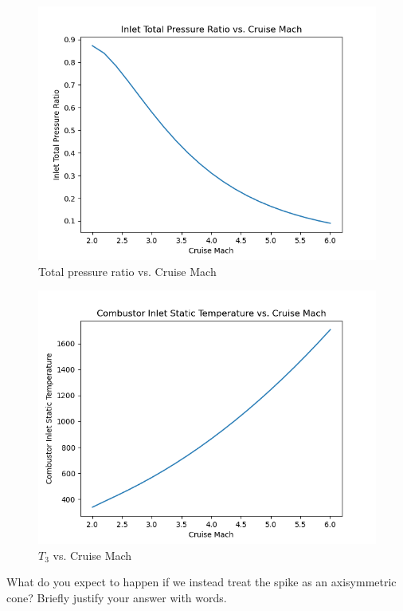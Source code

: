\documentclass[../main.tex]{subfiles}
\begin{document}
\begin{figure}[h!]
    \centering
    \includegraphics[scale=0.6]{../../images/problem_2/tpr_vs_mach.png}
    \caption{Total pressure ratio vs. Cruise Mach}
    \label{tpr_vs_mach}
\end{figure}

\begin{figure}[h!]
    \centering
    \includegraphics[scale=0.6]{../../images/problem_2/t3_vs_mach.png}
    \caption{\(T_3\) vs. Cruise Mach}
    \label{t3_vs_mach}
\end{figure}

\clearpage


What do you expect to happen if we instead treat the spike as an axisymmetric cone?
Briefly justify your answer with words.
\end{document}
